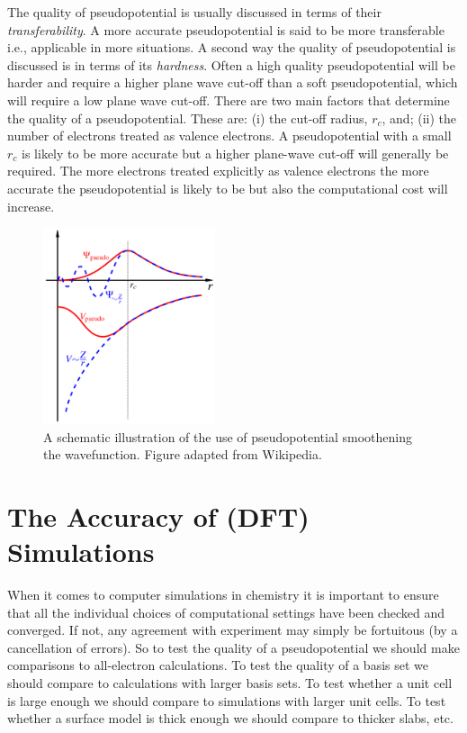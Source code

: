 \documentclass{article}
\theoremstyle{plain}\theoremheaderfont{\normalfont\itshape}\theorembodyfont{\rmfamily}\theoremseparator{.}\newtheorem*{rem}{Remark}\newtheorem*{ex}{Example}\newtheorem*{proof}{Proof}\newtheorem*{altp}{Alternative proof}
\theoremstyle{plain}\theoremheaderfont{\normalfont\bfseries}\theorembodyfont{\rmfamily}\theoremseparator{.}\newtheorem{thm}{Theorem}[section]\newtheorem{lem}[thm]{Lemma}\newtheorem{prop}[thm]{Proposition}\newtheorem*{cor}{Corollary}\newtheorem{defn}[thm]{Definition}\newtheorem{clm}[thm]{Claim}\newtheorem{clminproof}{Claim}\newtheorem{pos}{Postulate}[section]
\theoremstyle{break}\theoremheaderfont{\normalfont\itshape}\theorembodyfont{\rmfamily}\theoremseparator{.\medskip}\newtheorem*{proofskip}{Proof}\newtheorem*{exs}{Examples}\newtheorem*{rems}{Remarks}
\theoremstyle{break}\theoremheaderfont{\normalfont\bfseries}\theorembodyfont{\rmfamily}\theoremseparator{.\medskip}\newtheorem{lemskip}[thm]{Lemma}\newtheorem{defnskip}[thm]{Definition}\newtheorem{propskip}[thm]{Proposition}\newtheorem{thmskip}[thm]{Theorem}
\numberwithin{equation}{section}
\begin{document}
    The quality of pseudopotential is usually discussed in terms of their \textit{transferability}. A more accurate pseudopotential is said to be more transferable i.e., applicable in more situations. A second way the quality of pseudopotential is discussed is in terms of its \textit{hardness}. Often a high quality pseudopotential will be harder and require a higher plane wave cut-off than a soft pseudopotential, which will require a low plane wave cut-off. There are two main factors that determine the quality of a pseudopotential. These are: (i) the cut-off radius, \(r_c\), and; (ii) the number of electrons treated as valence electrons. A pseudopotential with a small \(r_c\) is likely to be more accurate but a higher plane-wave cut-off will generally be required. The more electrons treated explicitly as valence electrons the more accurate the pseudopotential is likely to be but also the computational cost will increase.

    \begin{figure}
        \centering
        \includegraphics[width=0.45\textwidth]{Pseudopotentials.png}
        \caption{A schematic illustration of the use of pseudopotential smoothening the wavefunction. Figure adapted from Wikipedia.}
    \end{figure}

    \section{The Accuracy of (DFT) Simulations}
    When it comes to computer simulations in chemistry it is important to ensure that all the individual choices of computational settings have been checked and converged. If not, any agreement with experiment may simply be fortuitous (by a cancellation of errors). So to test the quality of a pseudopotential we should make comparisons to all-electron calculations. To test the quality of a basis set we should compare to calculations with larger basis sets. To test whether a unit cell is large enough we should compare to simulations with larger unit cells. To test whether a surface model is thick enough we should compare to thicker slabs, etc.
\end{document}

